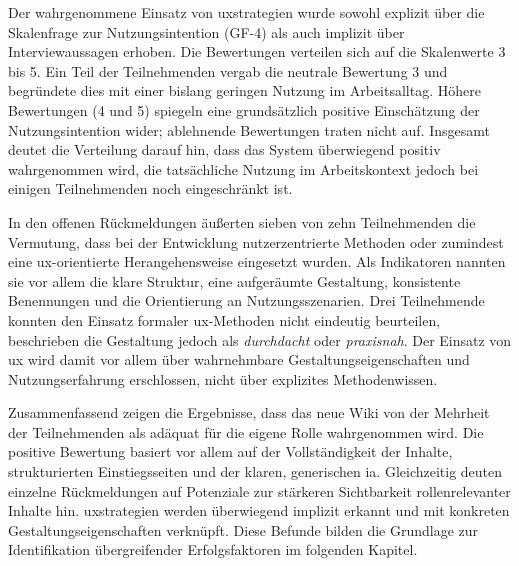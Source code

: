 Der wahrgenommene Einsatz von \Gls{uxstrategien} wurde sowohl explizit über die Skalenfrage zur Nutzungsintention (GF-4) als auch implizit über Interviewaussagen erhoben. Die Bewertungen verteilen sich auf die Skalenwerte 3 bis 5. Ein Teil der Teilnehmenden vergab die neutrale Bewertung 3 und begründete dies mit einer bislang geringen Nutzung im Arbeitsalltag. Höhere Bewertungen (4 und 5) spiegeln eine grundsätzlich positive Einschätzung der Nutzungsintention wider; ablehnende Bewertungen traten nicht auf. Insgesamt deutet die Verteilung darauf hin, dass das System überwiegend positiv wahrgenommen wird, die tatsächliche Nutzung im Arbeitskontext jedoch bei einigen Teilnehmenden noch eingeschränkt ist.

In den offenen Rückmeldungen äußerten sieben von zehn Teilnehmenden die Vermutung, dass bei der Entwicklung nutzerzentrierte Methoden oder zumindest eine \Gls{ux}-orientierte Herangehensweise eingesetzt wurden. Als Indikatoren nannten sie vor allem die klare Struktur, eine aufgeräumte Gestaltung, konsistente Benennungen und die Orientierung an Nutzungsszenarien. Drei Teilnehmende konnten den Einsatz formaler \Gls{ux}-Methoden nicht eindeutig beurteilen, beschrieben die Gestaltung jedoch als \textit{\glqq durchdacht\grqq{}} oder \textit{\glqq praxisnah\grqq{}}. Der Einsatz von \Gls{ux} wird damit vor allem über wahrnehmbare Gestaltungseigenschaften und Nutzungserfahrung erschlossen, nicht über explizites Methodenwissen.

Zusammenfassend zeigen die Ergebnisse, dass das neue Wiki von der Mehrheit der Teilnehmenden als adäquat für die eigene Rolle wahrgenommen wird. Die positive Bewertung basiert vor allem auf der Vollständigkeit der Inhalte, strukturierten Einstiegsseiten und der klaren, generischen \Gls{ia}. Gleichzeitig deuten einzelne Rückmeldungen auf Potenziale zur stärkeren Sichtbarkeit rollenrelevanter Inhalte hin. \Gls{uxstrategien} werden überwiegend implizit erkannt und mit konkreten Gestaltungseigenschaften verknüpft. Diese Befunde bilden die Grundlage zur Identifikation übergreifender Erfolgsfaktoren im folgenden Kapitel.